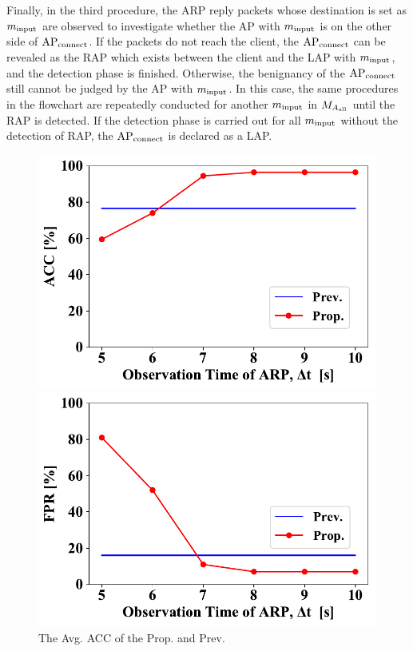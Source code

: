 \documentclass[conference]{IEEEtran}
\newcommand{\tarAP}{\rm AP_{connect}}
\newcommand{\inputMAC}{m_{\rm input}}
\begin{document}
Finally, in the third procedure, the ARP reply packets whose destination is set as $\inputMAC$ are observed to investigate whether the AP with $\inputMAC$ is on the other side of $\tarAP$.
If the packets do not reach the client, the $\tarAP$ can be revealed as the RAP which exists between the client and the LAP with $\inputMAC$, and the detection phase is finished.
Otherwise, the benignancy of the $\tarAP$ still cannot be judged by the AP with $\inputMAC$.
In this case, the same procedures in the flowchart are repeatedly conducted for another $\inputMAC$ in $M_{A_{\rm all}}$ until the RAP is detected.
If the detection phase is carried out for all $\inputMAC$ without the detection of RAP, the $\tarAP$ is declared as a LAP.
\begin{figure}[ht]
    \begin{minipage}{0.33\hsize}
        \begin{center}
            \includegraphics[scale=0.34]{figure/ACC.pdf}
        \end{center}
        \caption{The Avg. ACC of the Prop. and Prev.}
        \label{fig:acc}
    \end{minipage}
        \begin{minipage}{0.33\hsize}
        \begin{center}
            \includegraphics[scale=0.34]{figure/FPR.pdf}

\end{center}
\end{minipage}
\end{figure}
\end{document}
